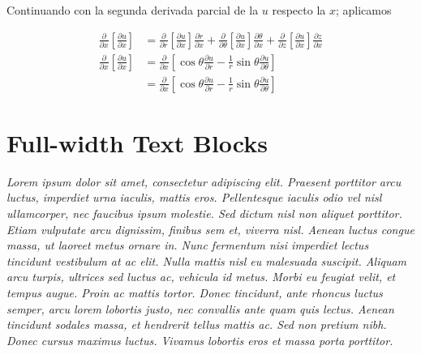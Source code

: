\documentclass[letter]{tufte-handout} %
\begin{document}
Continuando con la segunda derivada parcial de la $u$ respecto la $x$; aplicamos

\begin{align}
	\frac{\partial}{\partial x}\left[\frac{\partial u}{\partial x}\right] & =
	\frac{\partial}{\partial r}\left[\frac{\partial u}{\partial x}\right]\frac{\partial r}{\partial x} +
	\frac{\partial}{\partial \theta}\left[\frac{\partial u}{\partial x}\right]\frac{\partial \theta}{\partial x}
	+ \frac{\partial}{\partial z}\left[\frac{\partial u}{\partial x}\right]\frac{\partial z}{\partial x}                                                   \\
	\frac{\partial}{\partial x}\left[\frac{\partial u}{\partial x}\right] & =
	\frac{\partial}{\partial x}\left[\cos{\theta}\frac{\partial u}{\partial r} -
	\frac{1}{r}\sin{\theta}\frac{\partial u}{\partial \theta}\right]                                                                                       \\
	                                                                      & = \frac{\partial}{\partial x}\left[\cos{\theta}\frac{\partial u}{\partial r} -
		\frac{1}{r}\sin{\theta}\frac{\partial u}{\partial \theta}\right]
\end{align}


\section{Full-width Text Blocks}\label{sec:fullwidthtextblocks}

\begin{fullwidth}
	\small\itshape Lorem ipsum dolor sit amet, consectetur adipiscing elit. Praesent porttitor arcu luctus, imperdiet urna iaculis, mattis eros. Pellentesque iaculis odio vel nisl ullamcorper, nec faucibus ipsum molestie. Sed dictum nisl non aliquet porttitor. Etiam vulputate arcu dignissim, finibus sem et, viverra nisl. Aenean luctus congue massa, ut laoreet metus ornare in. Nunc fermentum nisi imperdiet lectus tincidunt vestibulum at ac elit. Nulla mattis nisl eu malesuada suscipit. Aliquam arcu turpis, ultrices sed luctus ac, vehicula id metus. Morbi eu feugiat velit, et tempus augue. Proin ac mattis tortor. Donec tincidunt, ante rhoncus luctus semper, arcu lorem lobortis justo, nec convallis ante quam quis lectus. Aenean tincidunt sodales massa, et hendrerit tellus mattis ac. Sed non pretium nibh. Donec cursus maximus luctus. Vivamus lobortis eros et massa porta porttitor.
\end{fullwidth}
\end{document}

